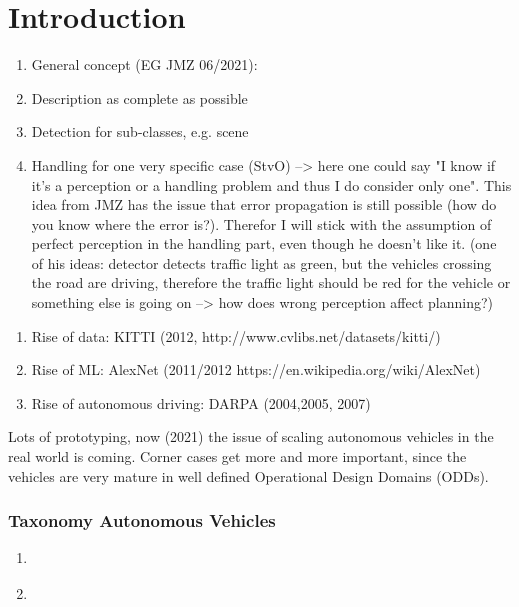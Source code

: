 \chapter{Introduction}
\label{chap:introduction}


\begin{enumerate}
    \item General concept (EG JMZ 06/2021):
    \item Description as complete as possible
    \item Detection for sub-classes, e.g. scene
    \item Handling for one very specific case (StvO) --> here one could say "I know if it's a perception or a handling problem and thus I do consider only one". This idea from JMZ has the issue that error propagation is still possible (how do you know where the error is?). Therefor I will stick with the assumption of perfect perception in the handling part, even though he doesn't like it. (one of his ideas: detector detects traffic light as green, but the vehicles crossing the road are driving, therefore the traffic light should be red for the vehicle or something else is going on --> how does wrong perception affect planning?) 
\end{enumerate}

\begin{enumerate}
    \item Rise of data: KITTI (2012, http://www.cvlibs.net/datasets/kitti/)
    \item Rise of ML: AlexNet (2011/2012 https://en.wikipedia.org/wiki/AlexNet)
    \item Rise of autonomous driving: DARPA (2004,2005, 2007)
\end{enumerate}

Lots of prototyping, now (2021) the issue of scaling autonomous vehicles in the real world is coming. Corner cases get more and more important, since the vehicles are very mature in well defined Operational Design Domains (ODDs).

\subsection*{Taxonomy Autonomous Vehicles}

\begin{enumerate}
    \item \cite{sae_j3016c_2021}
    \item \cite{bundesregierung_entwurf_2021}
\end{enumerate}

